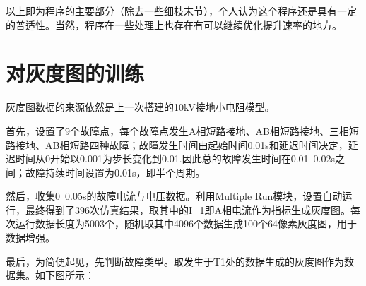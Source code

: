 \documentclass{article}
\begin{document}
	以上即为程序的主要部分（除去一些细枝末节），个人认为这个程序还是具有一定的普适性。当然，程序在一些处理上也存在有可以继续优化提升速率的地方。
	
	
	\section{对灰度图的训练}
	
	灰度图数据的来源依然是上一次搭建的10kV接地小电阻模型。
	
	首先，设置了9个故障点，每个故障点发生A相短路接地、AB相短路接地、三相短路接地、AB相短路四种故障；故障发生时间由起始时间0.01s和延迟时间决定，延迟时间从0开始以0.001为步长变化到0.01.因此总的故障发生时间在0.01~0.02s之间；故障持续时间设置为0.01s，即半个周期。
	
	然后，收集0~0.05s的故障电流与电压数据。利用Multiple Run模块，设置自动运行，最终得到了396次仿真结果，取其中的I\_1即A相电流作为指标生成灰度图。每次运行数据长度为5003个，随机取其中4096个数据生成100个64像素灰度图，用于数据增强。
	
	最后，为简便起见，先判断故障类型。取发生于T1处的数据生成的灰度图作为数据集。如下图所示：
	
\end{document}
